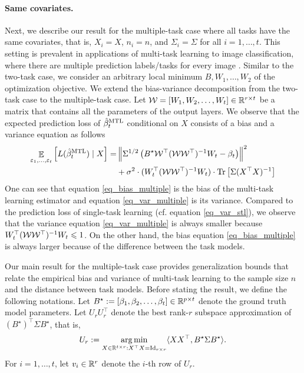 \paragraph{Same covariates.}
Next, we describe our result for the multiple-task case where all tasks have the same covariates, that is, $X_i = X$, $n_i = n$, and $\Sigma_i = \Sigma$ for all $i = 1, \dots, t$.
This setting is prevalent in applications of multi-task learning to image classification, where there are multiple prediction labels/tasks for every image \cite{chexnet17,EA20}.
Similar to the two-task case, we consider an arbitrary local minimum $B, W_1, \dots, W_2$ of the optimization objective.
We extend the bias-variance decomposition from the two-task case to the multiple-task case.
Let $\mathcal W = [W_1, W_2, \dots, W_t] \in \mathbb{R}^{r\times t}$ be a matrix that contains all the parameters of the output layers.
We observe that the expected prediction loss of $\hat{\beta}_t^{\textup{MTL}}$ conditional on $X$ consists of a bias and a variance equation as follows
\begin{align}
	\mathop{\mathbb{E}}_{\varepsilon_1, \dots, \varepsilon_t}\left[ L(\hat{\beta}_t^{\textup{MTL}}) \mid X \right]
	=& \left\| \Sigma^{1/2} \left({B^{\star} {\mathcal W}^{\top} ({\mathcal W} {\mathcal W}^{\top})^{-1} W_t - \beta_t}\right) \right\|^2 \label{eq_bias_multiple} \\
	&+ \sigma^2 \cdot (W_t^{\top} ({\mathcal W} {\mathcal W}^{\top})^{-1} W_t) \cdot \operatorname{Tr}\left[\Sigma (X^{\top} X)^{-1}\right] \label{eq_var_multiple}
\end{align}
One can see that equation \eqref{eq_bias_multiple} is the bias of the multi-task learning estimator and equation \eqref{eq_var_multiple} is its variance.
Compared to the prediction loss of single-task learning (cf. equation \eqref{eq_var_stl}), we observe that the variance equation \eqref{eq_var_multiple} is always smaller because $W_t^{\top} ({\mathcal W} {\mathcal W}^{\top})^{-1} W_t \leqslant 1$.
On the other hand, the bias equation \eqref{eq_bias_multiple} is always larger because of the difference between the task models.

Our main result for the multiple-task case provides generalization bounds that relate the empirical bias and variance of multi-task learning to the sample size $n$ and the distance between task models.
Before stating the result, we define the following notations.
Let $B^\star := [{\beta}_1,{\beta}_2,\dots,{\beta}_{t}] \in \mathbb{R}^{p\times t}$ denote the ground truth model parameters.
Let $U_r U_r^{\top}$ denote the best rank-$r$ subspace approximation of $(B^{\star})^\top\Sigma B^{\star}$, that is,
\[ U_r := \operatorname*{arg\,min}_{X\in\mathbb{R}^{t\times r} : X^{\top} X = \operatorname{Id}_{r\times r}} \langle X X^{\top}, B^{\star} \Sigma B^{\star} \rangle. \]
For $i = 1,\dots, t$, let $v_i \in\mathbb{R}^r$ denote the $i$-th row of $U_r$.

